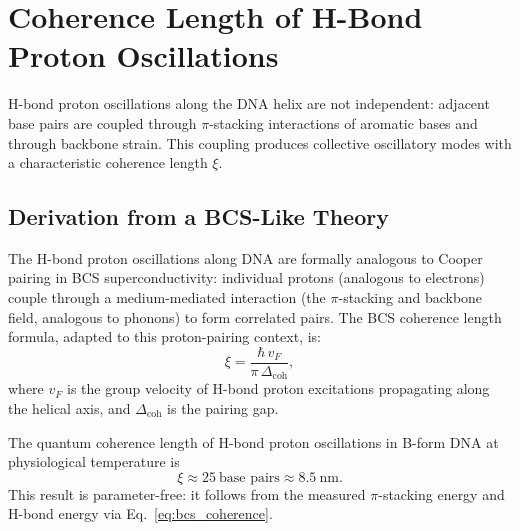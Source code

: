 \section{Coherence Length of H-Bond Proton Oscillations}
\label{sec:coherence_length}

H-bond proton oscillations along the DNA helix are not independent: adjacent
base pairs are coupled through $\pi$-stacking interactions of aromatic bases
and through backbone strain. This coupling produces collective oscillatory modes
with a characteristic coherence length $\xi$.

\subsection{Derivation from a BCS-Like Theory}
\label{ssec:bcs_coherence}

The H-bond proton oscillations along DNA are formally analogous to Cooper
pairing in BCS superconductivity: individual protons (analogous to electrons)
couple through a medium-mediated interaction (the $\pi$-stacking and backbone
field, analogous to phonons) to form correlated pairs. The BCS coherence
length formula, adapted to this proton-pairing context, is:
\begin{equation}
  \xi = \frac{\hbar\,v_F}{\pi\,\Delta_{\mathrm{coh}}},
  \label{eq:bcs_coherence}
\end{equation}
where $v_F$ is the group velocity of H-bond proton excitations propagating
along the helical axis, and $\Delta_{\mathrm{coh}}$ is the pairing gap.

\begin{theorem}
\label{thm:coherence_length}
The quantum coherence length of H-bond proton oscillations in B-form DNA at
physiological temperature is
\begin{equation}
  \xi \approx 25\ \text{base pairs} \approx 8.5\ \mathrm{nm}.
  \label{eq:coherence_length}
\end{equation}
This result is parameter-free: it follows from the measured $\pi$-stacking
energy and H-bond energy via Eq.~\eqref{eq:bcs_coherence}.
\end{theorem}

